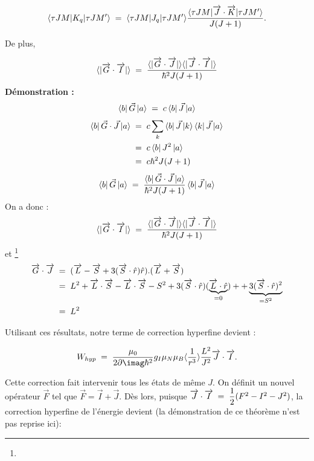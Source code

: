\[
    \langle\tau JM|K_q|\tau JM'\rangle \; = \;   \langle\tau JM|J_q|\tau JM'\rangle\dfrac{ \langle\tau JM|\overrightarrow{J}\cdot\overrightarrow{K}|\tau JM'\rangle}{J(J+1)}.
\]

De plus, 

\[
    \langle |\overrightarrow{G}\cdot\overrightarrow{I}| \rangle \; = \;  \dfrac{\langle |\overrightarrow{G}\cdot\overrightarrow{J}| \rangle\langle |\overrightarrow{J}\cdot\overrightarrow{I}| \rangle}{\hbar^2J(J+1)}
\]
\textbf{Démonstration :}\\
\[
    \bra{b}\vec{G}\ket{a}
    \; = \; c\bra{b}\vec{J}\ket{a}
\]
\begin{align*}
    \bra{b}\vec{G} \cdot \vec{J}\ket{a}
    &\; = \;  c\sum_k \bra{b}\vec{J}\ket{k}\bra{k}\vec{J}\ket{a}\\
    &\; = \;  c\bra{b}J^2\ket{a}\\
    &\; = \;  c\hbar^2 J(J+1)
\end{align*}
\[
    \bra{b}\vec{G}\ket{a} \; = \; \dfrac{\bra{b}\vec{G} \cdot \vec{J}\ket{a}}{\hbar^2 J(J+1)}\bra{b}\vec{J}\ket{a}
\]
On a donc :
\[
    \langle |\overrightarrow{G}\cdot\overrightarrow{I}| \rangle \; = \;  \dfrac{\langle |\overrightarrow{G}\cdot\overrightarrow{J}| \rangle\langle |\overrightarrow{J}\cdot\overrightarrow{I}| \rangle}{\hbar^2J(J+1)}
\]
et \footnote{}
\begin{align*}
    \overrightarrow{G}\cdot\overrightarrow{J} 
    &\; = \;  (\overrightarrow{L}-\overrightarrow{S}+3(\overrightarrow{S}\cdot\hat{r})\hat{r}).(\overrightarrow{L}+\overrightarrow{S})\\ 
    &\; = \; L^2 + \overrightarrow{L}\cdot\overrightarrow{S} -\overrightarrow{L}\cdot\overrightarrow{S} - S^2 + 3 (\overrightarrow{S}\cdot\hat{r})(\underbrace{\overrightarrow{L}\cdot\hat{r}}_{= 0}) + +\underbrace{3(\overrightarrow{S}\cdot\hat{r})^2}_{=S^2}\\
    &\; = \;  L^2
\end{align*}

Utilisant ces résultats, notre terme de correction hyperfine devient : 

\begin{equation}
    W_{hyp} \eq  \dfrac{\mu_0}{2\p\imag\hbar^2}g_I\mu_N\mu_B\langle\dfrac{1}{r^3}\rangle \dfrac{L^2}{J^2}\overrightarrow{J}\cdot\overrightarrow{I}.
\end{equation}

Cette correction fait intervenir tous les états de même $J$. On définit un nouvel opérateur $\vec{F}$ tel que $\vec{F} = \vec{I} + \vec{J}$. Dès lors, puisque $\overrightarrow{J}\cdot\overrightarrow{I} \; = \;  \dfrac{1}{2}(F^2-I^2-J^2)$, la correction hyperfine  de l'énergie devient (la démonstration de ce théorème n'est pas reprise ici):


